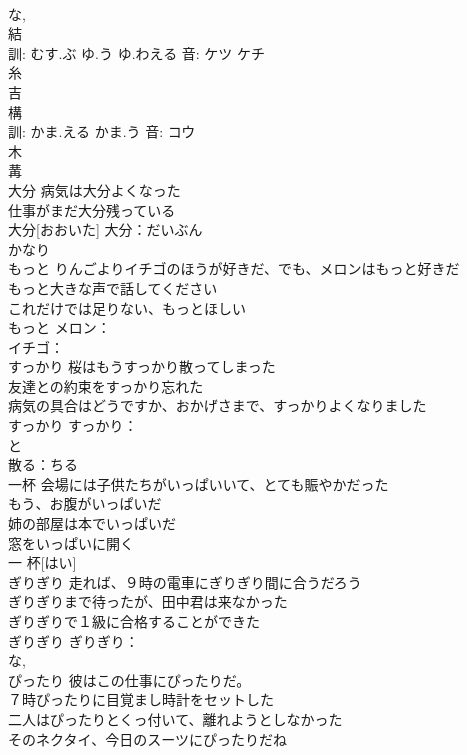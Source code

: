 \documentclass[8pt]{extreport}
\begin{document}
\begin{CJK}{UTF8}{min}
\\	な, 
\\	結 
\\	訓: むす.ぶ ゆ.う ゆ.わえる 音: ケツ ケチ 
\\	糸 
\\	吉 
\\	構 
\\	訓: かま.える かま.う 音: コウ 
\\	木 
\\	冓 
\\	大分	病気は大分よくなった 
\\	仕事がまだ大分残っている 
\\	大分[おおいた]			大分：だいぶん
\\	かなり 
\\	もっと	りんごよりイチゴのほうが好きだ、でも、メロンはもっと好きだ 
\\	もっと大きな声で話してください 
\\	これだけでは足りない、もっとほしい 
\\	もっと			メロン：
\\	イチゴ：
\\	すっかり	桜はもうすっかり散ってしまった 
\\	友達との約束をすっかり忘れた 
\\	病気の具合はどうですか、おかげさまで、すっかりよくなりました 
\\	すっかり			すっかり：
\\	と 
\\	散る：ちる
\\	一杯	会場には子供たちがいっぱいいて、とても賑やかだった 
\\	もう、お腹がいっぱいだ 
\\	姉の部屋は本でいっぱいだ 
\\	窓をいっぱいに開く 
\\	一 杯[はい]						
\\	ぎりぎり	走れば、９時の電車にぎりぎり間に合うだろう 
\\	ぎりぎりまで待ったが、田中君は来なかった 
\\	ぎりぎりで１級に合格することができた 
\\	ぎりぎり			ぎりぎり：
\\	な, 
\\	ぴったり	彼はこの仕事にぴったりだ。 
\\	７時ぴったりに目覚まし時計をセットした 
\\	二人はぴったりとくっ付いて、離れようとしなかった 
\\	そのネクタイ、今日のスーツにぴったりだね 

\end{CJK}
\end{document}

